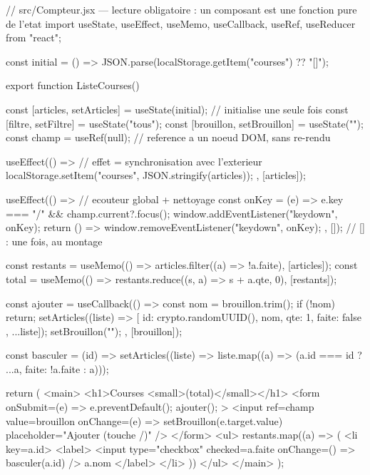 \begin{codejs}
// src/Compteur.jsx --- lecture obligatoire : un composant est une fonction pure de l'etat
import { useState, useEffect, useMemo, useCallback, useRef, useReducer } from "react";

const initial = () => JSON.parse(localStorage.getItem("courses") ?? "[]");

export function ListeCourses() {
  const [articles, setArticles] = useState(initial);          // initialise une seule fois
  const [filtre, setFiltre] = useState("tous");
  const [brouillon, setBrouillon] = useState("");
  const champ = useRef(null);                                  // reference a un noeud DOM, sans re-rendu

  useEffect(() => {                                            // effet = synchronisation avec l'exterieur
    localStorage.setItem("courses", JSON.stringify(articles));
  }, [articles]);

  useEffect(() => {                                            // ecouteur global + nettoyage
    const onKey = (e) => e.key === "/" && champ.current?.focus();
    window.addEventListener("keydown", onKey);
    return () => window.removeEventListener("keydown", onKey);
  }, []);                                                        // [] : une fois, au montage

  const restants = useMemo(() => articles.filter((a) => !a.faite), [articles]);
  const total = useMemo(() => restants.reduce((s, a) => s + a.qte, 0), [restants]);

  const ajouter = useCallback(() => {
    const nom = brouillon.trim();
    if (!nom) return;
    setArticles((liste) => [{ id: crypto.randomUUID(), nom, qte: 1, faite: false }, ...liste]);
    setBrouillon("");
  }, [brouillon]);

  const basculer = (id) =>
    setArticles((liste) => liste.map((a) => (a.id === id ? { ...a, faite: !a.faite } : a)));

  return (
    <main>
      <h1>Courses <small>({total})</small></h1>
      <form onSubmit={(e) => { e.preventDefault(); ajouter(); }}>
        <input ref={champ} value={brouillon} onChange={(e) => setBrouillon(e.target.value)}
               placeholder="Ajouter (touche /)" />
      </form>
      <ul>
        {restants.map((a) => (
          <li key={a.id}>
            <label>
              <input type="checkbox" checked={a.faite} onChange={() => basculer(a.id)} />
              {a.nom}
            </label>
          </li>
        ))}
      </ul>
    </main>
  );
}
\end{codejs}

